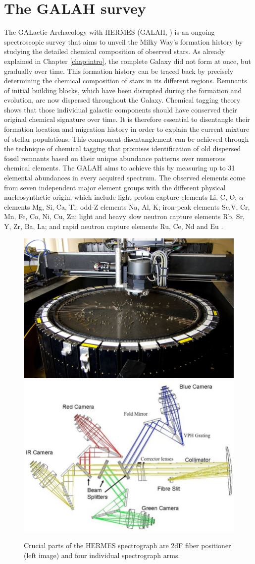 \section{The GALAH survey}
\label{sec:galah_data}
The GALactic Archaeology with HERMES (GALAH, \cite{2015MNRAS.449.2604D}) is an ongoing spectroscopic survey that aims to unveil the Milky Way’s formation history by studying the detailed chemical composition of observed stars. As already explained in Chapter \ref{chap:intro}, the complete Galaxy did not form at once, but gradually over time. This formation history can be traced back by precisely determining the chemical composition of stars in its different regions. Remnants of initial building blocks, which have been disrupted during the formation and evolution, are now dispersed throughout the Galaxy. Chemical tagging theory \cite{2002ARA&A..40..487F} shows that those individual galactic components should have conserved their original chemical signature over time. It is therefore essential to disentangle their formation location and migration history in order to explain the current mixture of stellar populations. This component disentanglement can be achieved through the technique of chemical tagging that promises identification of old dispersed fossil remnants based on their unique abundance patterns over numerous chemical elements. The GALAH aims to achieve this by measuring up to 31 elemental abundances in every acquired spectrum. The observed elements come from seven independent major element groups with the different physical nucleosynthetic origin, which include light proton-capture elements Li, C, O; $\alpha$-elements Mg, Si, Ca, Ti; odd-Z elements Na, Al, K; iron-peak elements Sc,V, Cr, Mn, Fe, Co, Ni, Cu, Zn; light and heavy slow neutron capture elements Rb, Sr, Y, Zr, Ba, La; and rapid neutron capture elements Ru, Ce, Nd and Eu \cite{2015MNRAS.449.2604D}.

\begin{figure}
	\centering
	\includegraphics[width=0.48\columnwidth]{2df.jpg}
	\includegraphics[width=0.48\columnwidth]{Optical-layout-of-the-HERMES-spectrograph.png}
	\caption{Crucial parts of the HERMES spectrograph are 2dF fiber positioner (left image) and four individual spectrograph arms.}
	\label{fig:hermes_2df}
\end{figure}

